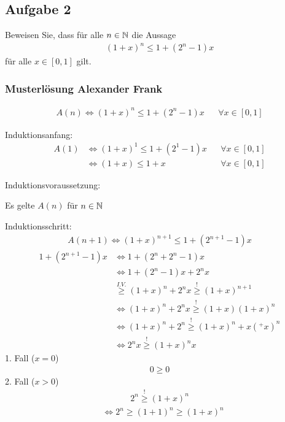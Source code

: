 
\newpage
\subsection{Aufgabe 2}

Beweisen Sie, dass für alle $n \in \mathbb N$ die Aussage
\begin{align*}
    (1 + x)^n \leq 1 + (2^n -1)x
\end{align*}
für alle $x \in [0, 1]$ gilt.

\subsubsection{Musterlösung Alexander Frank}

\begin{align*}
    A(n) \Leftrightarrow (1 + x)^n \leq 1 + (2^n -1)x &&\forall x \in [0, 1]
\end{align*}

Induktionsanfang:
\begin{align*}
    A(1) &\Leftrightarrow (1 + x)^1 \leq 1 +(2^1 - 1)x &&\forall x \in [0, 1]\\
    &\Leftrightarrow (1 +x) \leq 1 + x  &&\forall x \in [0, 1]
\end{align*}

Induktionsvoraussetzung:
\begin{center}
    Es gelte $A(n)$ für $n \in \mathbb N$
\end{center}

Induktionsschritt:
\begin{align*}
    A(n + 1) \Leftrightarrow (1 + x)^{n+1} \leq 1 + (2^{n+1} - 1)x
\end{align*}
\begin{align*}
    1 + (2^{n+1} -1)x &\Leftrightarrow 1 + (2^n + 2^n -1)x\\
    &\Leftrightarrow 1 + (2^n -1)x + 2^nx\\
    &\overset{I.V.}{\geq} (1 + x)^n + 2^nx \overset{!}{\geq} (1 + x)^{n+1}\\
    &\Leftrightarrow (1 + x)^n + 2^nx \overset{!}{\geq} (1 + x) (1+x)^n\\
    &\Leftrightarrow (1 + x)^n + 2^n \overset{!}{\geq} (1 + x)^n + x(^+x)^n\\
    &\Leftrightarrow 2^nx \overset{!}{\geq} (1 +x)^nx
\end{align*}
1. Fall ($x = 0$)
\begin{align*}
    0 \geq 0
\end{align*}
2. Fall ($x > 0$)
\begin{align*}
    2^n \overset{!}{\geq} (1 + x)^n
\end{align*}
\begin{align*}
    &\Leftrightarrow 2^n \geq (1 + 1)^n \geq (1 + x)^n
\end{align*}